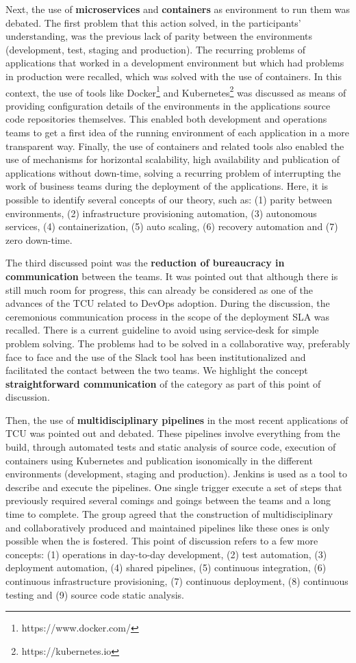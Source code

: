 Next, the use of \textbf{microservices} and \textbf{containers} as environment
to run them was debated. The first problem that this action solved, in the
participants' understanding, was the previous lack of parity between the environments
(development, test, staging and production). The recurring problems of
applications that worked in a development environment but which had problems
in production were recalled, which was solved with the use of containers. In
this context, the use of tools like Docker\footnote{https://www.docker.com/}
and Kubernetes\footnote{https://kubernetes.io} was discussed as means of providing
configuration details of the environments in the applications source code
repositories themselves. This enabled both development and operations teams to
get a first idea of the running environment of each application in a more
transparent way. Finally, the use of containers and related tools also enabled
the use of mechanisms for horizontal scalability, high availability and
publication of applications without down-time, solving a recurring problem of
interrupting the work of business teams during the deployment of the applications.
Here, it is possible to identify several concepts of our theory, such as:
(1) parity between environments, (2) infrastructure provisioning automation,
(3) autonomous services, (4) containerization, (5) auto scaling, (6) recovery
automation and (7) zero down-time.

The third discussed point was the \textbf{reduction of bureaucracy in communication}
between the teams. It was pointed out that although there is still much room
for progress, this can already be considered as one of the advances of the TCU
related to DevOps adoption. During the discussion, the ceremonious
communication process in the scope of the deployment SLA was recalled. There is
a current guideline to avoid using service-desk for simple problem solving. The
problems had to be solved in a collaborative way, preferably face to face and
the use of the Slack tool has been institutionalized and facilitated the contact
between the two teams. We highlight the concept \textbf{straightforward communication}
of the \cc category as part of this point of discussion.

Then, the use of \textbf{multidisciplinary pipelines} in the most recent applications of
TCU was pointed out and debated. These pipelines involve everything from the
build, through automated tests and static analysis of source code, execution of
containers using Kubernetes and publication isonomically in the different
environments (development, staging and production). Jenkins is used as a tool
to describe and execute the pipelines. One single trigger execute a set of
steps that previously required several comings and goings between the teams and
a long time to complete. The group agreed that the construction of multidisciplinary
and collaboratively produced and maintained pipelines like these ones is only
possible when the \cc is fostered. This point of discussion refers to a few
more concepts: (1) operations in day-to-day development, (2) test automation,
(3) deployment automation, (4) shared pipelines, (5) continuous integration,
(6) continuous infrastructure provisioning, (7) continuous deployment,
(8) continuous testing and (9) source code static analysis.

